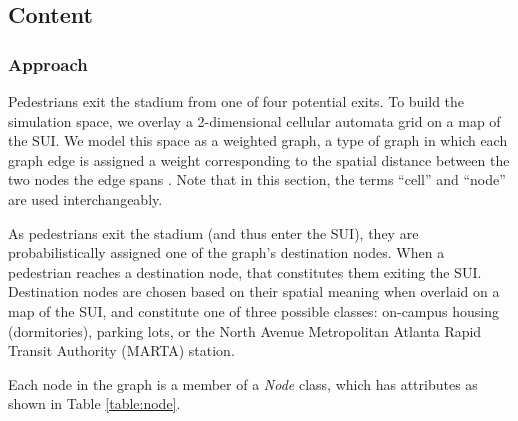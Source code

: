 \documentclass[12pt]{article}
\begin{document}
\subsection{Content}

\subsubsection{Approach}
Pedestrians exit the stadium from one of four potential exits. To build the
simulation space, we overlay a 2-dimensional cellular automata grid on a map of
the SUI. We model this space as a weighted graph, a type of graph in which each
graph edge is assigned a weight corresponding to the spatial distance between
the two nodes the edge spans \cite{west2001introduction}. Note that in this
section, the terms ``cell'' and ``node'' are used interchangeably.

As pedestrians exit the stadium (and thus enter the SUI), they are
probabilistically assigned one of the graph’s destination nodes.  When a
pedestrian reaches a destination node, that constitutes them exiting the SUI.
Destination nodes are chosen based on their spatial meaning when overlaid on a
map of the SUI, and constitute one of three possible classes: on-campus housing
(dormitories), parking lots, or the North Avenue Metropolitan Atlanta Rapid
Transit Authority (MARTA) station.

Each node in the graph is a member of a \textit{Node} class, which
has attributes as shown in Table \ref{table:node}.
\end{document}
